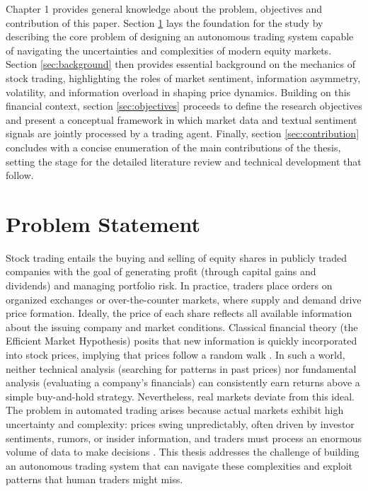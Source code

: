 Chapter 1 provides general knowledge about the problem, objectives and contribution of this paper. Section \ref{sec:problem} lays the foundation for the study by describing the core problem of designing an autonomous trading system capable of navigating the uncertainties and complexities of modern equity markets. Section \ref{sec:background} then provides essential background on the mechanics of stock trading, highlighting the roles of market sentiment, information asymmetry, volatility, and information overload in shaping price dynamics. Building on this financial context, section \ref{sec:objectives}  proceeds to define the research objectives and present a conceptual framework in which market data and textual sentiment signals are jointly processed by a trading agent. Finally, section \ref{sec:contribution} concludes with a concise enumeration of the main contributions of the thesis, setting the stage for the detailed literature review and technical development that follow.

\section{Problem Statement}
\label{sec:problem}
Stock trading entails the buying and selling of equity shares in publicly traded companies with the goal of generating profit (through capital gains and dividends) and managing portfolio risk. In practice, traders place orders on organized exchanges or over-the-counter markets, where supply and demand drive price formation. Ideally, the price of each share reflects all available information about the issuing company and market conditions. Classical financial theory (the Efficient Market Hypothesis) posits that new information is quickly incorporated into stock prices, implying that prices follow a random walk \cite{Malkiel2003}. In such a world, neither technical analysis (searching for patterns in past prices) nor fundamental analysis (evaluating a company's financials) can consistently earn returns above a simple buy-and-hold strategy. Nevertheless, real markets deviate from this ideal. The problem in automated trading arises because actual markets exhibit high uncertainty and complexity: prices swing unpredictably, often driven by investor sentiments, rumors, or insider information, and traders must process an enormous volume of data to make decisions \cite{Kyle1985, Malkiel2003, Kahneman2011, Ivashina2011}. This thesis addresses the challenge of building an autonomous trading system that can navigate these complexities and exploit patterns that human traders might miss.

